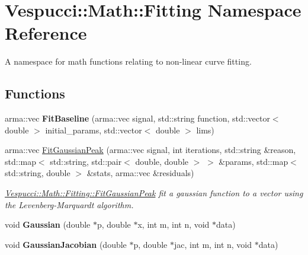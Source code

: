 \hypertarget{namespace_vespucci_1_1_math_1_1_fitting}{\section{Vespucci\+:\+:Math\+:\+:Fitting Namespace Reference}
\label{namespace_vespucci_1_1_math_1_1_fitting}
}


A namespace for math functions relating to non-\/linear curve fitting.  


\subsection*{Functions}
\begin{DoxyCompactItemize}
\item 
\hypertarget{namespace_vespucci_1_1_math_1_1_fitting_a6a3b8f03530b331694b06842312ff706}{arma\+::vec {\bfseries Fit\+Baseline} (arma\+::vec signal, std\+::string function, std\+::vector$<$ double $>$ initial\+\_\+params, std\+::vector$<$ double $>$ lims)}\label{namespace_vespucci_1_1_math_1_1_fitting_a6a3b8f03530b331694b06842312ff706}

\item 
arma\+::vec \hyperlink{namespace_vespucci_1_1_math_1_1_fitting_a7ccac4eb07dd9eaa7c891e8d78be6390}{Fit\+Gaussian\+Peak} (arma\+::vec signal, int iterations, std\+::string \&reason, std\+::map$<$ std\+::string, std\+::pair$<$ double, double $>$ $>$ \&params, std\+::map$<$ std\+::string, double $>$ \&stats, arma\+::vec \&residuals)
\begin{DoxyCompactList}\small\item\em \hyperlink{namespace_vespucci_1_1_math_1_1_fitting_a7ccac4eb07dd9eaa7c891e8d78be6390}{Vespucci\+::\+Math\+::\+Fitting\+::\+Fit\+Gaussian\+Peak} fit a gaussian function to a vector using the Levenberg-\/\+Marquardt algorithm. \end{DoxyCompactList}\item 
\hypertarget{namespace_vespucci_1_1_math_1_1_fitting_ad882180a79f7fb8c0b82c655345c2089}{void {\bfseries Gaussian} (double $\ast$p, double $\ast$x, int m, int n, void $\ast$data)}\label{namespace_vespucci_1_1_math_1_1_fitting_ad882180a79f7fb8c0b82c655345c2089}

\item 
\hypertarget{namespace_vespucci_1_1_math_1_1_fitting_a13a109b0157d2715cba67fc5e6630505}{void {\bfseries Gaussian\+Jacobian} (double $\ast$p, double $\ast$jac, int m, int n, void $\ast$data)}\label{namespace_vespucci_1_1_math_1_1_fitting_a13a109b0157d2715cba67fc5e6630505}


\end{DoxyCompactItemize}
